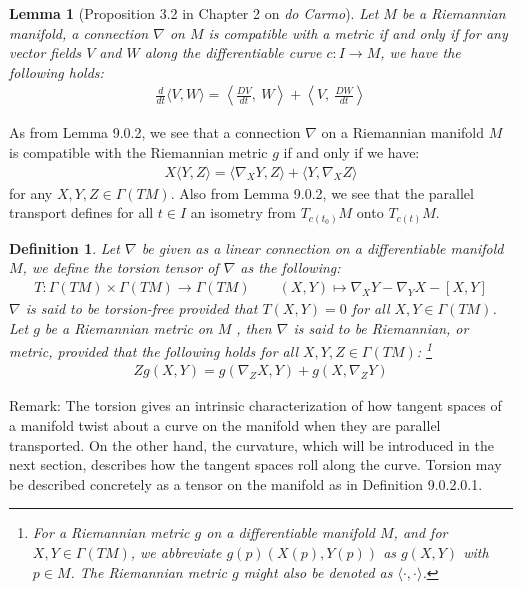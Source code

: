\documentclass[11pt]{book}
\theoremstyle{break}
\theoremstyle{break}
\newtheorem{lem}{Lemma}[thm]
\newtheorem{defn}{Definition}[corL]
\newcommand{\remark}{\color{blue}Remark: \color{black}}
\begin{document}
\begin{lem}[Proposition 3.2 in Chapter 2 on \textit{do Carmo}]
Let $M$ be a Riemannian manifold, a connection $\nabla$ on $M$ is compatible with a metric if and only if for any vector fields $V$ and $W$ along the differentiable curve $c:I \to M$, we have the following holds:
\begin{align*}
\frac{d}{dt}\langle V, W\rangle = \left\langle \frac{DV}{dt},\ W\right\rangle + \left\langle V, \ \frac{DW}{dt}\right\rangle
\end{align*}
\end{lem}

As from Lemma 9.0.2, we see that a connection $\nabla$ on a Riemannian manifold $M$ is compatible with the Riemannian metric $g$ if and only if we have:
\begin{align*}
X\langle Y, Z\rangle = \langle \nabla_X Y, Z \rangle + \langle Y, \nabla_X Z\rangle
\end{align*}
for any $X,Y,Z \in \Gamma(TM)$. Also from Lemma 9.0.2, we see that the parallel transport defines for all $t\in I$ an isometry from $T_{c(t_0)}M$ onto $T_{c(t)}M$. 

\begin{defn}
Let $\nabla$ be given as a linear connection on a differentiable manifold $M$, we define the torsion tensor of $\nabla$ as the following:
\begin{align*}
T:\Gamma(TM) \times \Gamma(TM) \to \Gamma(TM) \qquad (X,Y) \mapsto \nabla_XY - \nabla_YX - [X,Y]
\end{align*}
$\nabla$ is said to be torsion-free provided that $T(X,Y) = 0$ for all $X,Y \in \Gamma(TM)$. Let $g$ be a Riemannian metric on $M$ , then $\nabla $ is said to be Riemannian, or metric, provided that the following holds for all $X,Y,Z \in \Gamma(TM)$: \footnote{For a Riemannian metric $g$ on a differentiable manifold $M$, and for $X,Y \in \Gamma(TM)$, we abbreviate $g(p)(X(p),Y(p))$ as $g(X,Y)$ with $p \in M$. The Riemannian metric $g$ might also be denoted as $\langle \cdot, \cdot \rangle$.}
\begin{align}
Zg(X,Y)=g(\nabla_ZX,Y) + g(X,\nabla_Z Y)
\end{align}
\end{defn}

\remark The torsion gives an intrinsic characterization of how tangent spaces of a manifold twist about a curve on the manifold when they are parallel transported. On the other hand, the curvature, which will be introduced in the next section, describes how the tangent spaces roll along the curve. Torsion may be described concretely as a tensor  on the manifold as in Definition 9.0.2.0.1.
\end{document}
